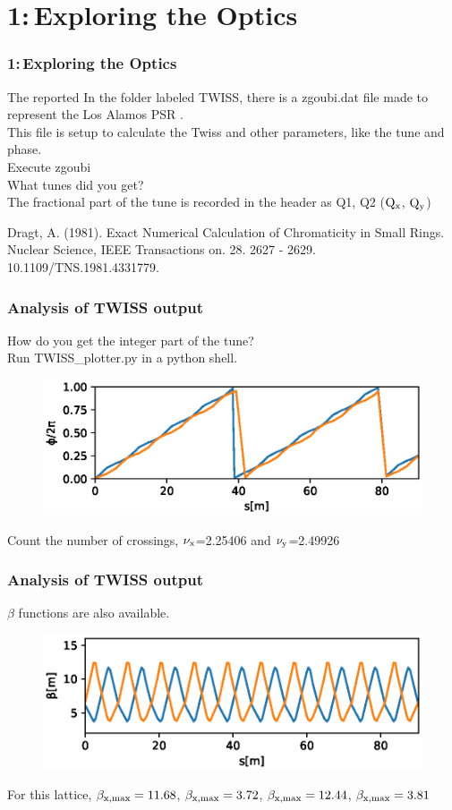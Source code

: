 \documentclass{beamer}
\begin{document}
\section{1:\,Exploring the Optics}

\begin{frame}
\frametitle{1:\,Exploring the Optics}
The reported 
In the folder labeled TWISS, there is a zgoubi.dat file made to represent the Los Alamos PSR \cite{AD1}.\\
This file is setup to calculate the Twiss and other parameters, like the tune and phase.\\ 
Execute zgoubi\\
What tunes did you get?\\
\hspace*{1em}The fractional part of the tune is recorded in the header as Q1, Q2 ($\rm Q_x$, $\rm Q_y$)
\vfill

\footnoterule
\tiny
\cite{AD1} Dragt, A. (1981). Exact Numerical Calculation of Chromaticity in Small Rings. Nuclear Science, IEEE Transactions on. 28. 2627 - 2629. 10.1109/TNS.1981.4331779. 
\end{frame}
\begin{frame}
\frametitle{Analysis of TWISS output}
How do you get the integer part of the tune?\\
Run TWISS\_plotter.py in a python shell.
\begin{figure}
\includegraphics[width=1.0\textwidth]{phi.eps}
\end{figure}
Count the number of crossings, $\rm \nu_x$=2.25406 and $\rm \nu_y$=2.49926\\
\end{frame}
\begin{frame}
\frametitle{Analysis of TWISS output}
$\beta$ functions are also available.
\begin{figure}
\includegraphics[width=1.0\textwidth]{beta.eps}
\end{figure}
For this lattice, $\rm \beta_{x,max}=11.68$, $\rm \beta_{x,max}=3.72$, $\rm \beta_{x,max}=12.44$, $\rm \beta_{x,max}=3.81$
\end{frame}
\end{document}
